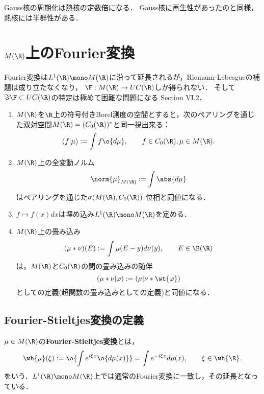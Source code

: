 \documentclass[uplatex,dvipdfmx]{jsreport}
\begin{document}
\begin{tcolorbox}[colframe=ForestGreen, colback=ForestGreen!10!white,breakable,colbacktitle=ForestGreen!40!white,coltitle=black,fonttitle=\bfseries\sffamily,
title=]
    Gauss核の周期化は熱核の定数倍になる．
    Gauss核に再生性があったのと同様，熱核には半群性がある．
\end{tcolorbox}

\section{$M(\R)$上のFourier変換}

\begin{tcolorbox}[colframe=ForestGreen, colback=ForestGreen!10!white,breakable,colbacktitle=ForestGreen!40!white,coltitle=black,fonttitle=\bfseries\sffamily,
title=]
    Fourier変換は$L^1(\R)\mono M(\R)$に沿って延長されるが，Riemann-Lebesgueの補題は成り立たなくなり，
    $\F:M(\R)\to UC(\R)$しか得られない．
    そして$\Im\F\subset UC(\R)$の特定は極めて困難な問題になる\cite{Katznelson-Fourier} Section VI.2．
\end{tcolorbox}

\begin{remarks}\mbox{}
    \begin{enumerate}
        \item $M(\R)$を$\R$上の符号付きBorel測度の空間とすると，次のペアリングを通じた双対空間$M(\R)=(C_0(\R))^*$と同一視出来る：
        \[(f|\mu):=\int f\o{d\mu},\qquad f\in C_0(\R),\mu\in M(\R).\]
        \item $M(\R)$上の全変動ノルム
        \[\norm{\mu}_{M(\R)}:=\int\abs{d\mu}\]
        はペアリングを通じた$\sigma(M(\R),C_0(\R))$-位相と同値になる．
        \item $f\mapsto f(x)dx$は埋め込み$L^1(\R)\mono M(\R)$を定める．
        \item $M(\R)$上の畳み込み
        \[(\mu*\nu)(E):=\int\mu(E-y)d\nu(y),\qquad E\in\B(\R)\]
        は，$M(\R)$と$C_0(\R)$の間の畳み込みの随伴
        \[(\mu*\nu|\varphi):=(\mu|\nu*\wt{\varphi})\]
        としての定義(超関数の畳み込みとしての定義)と同値になる．
    \end{enumerate}
\end{remarks}

\subsection{Fourier-Stieltjes変換の定義}

\begin{definition}
    $\mu\in M(\R)$の\textbf{Fourier-Stieltjes変換}とは，
    \[\wh{\mu}(\xi):=\o{\int e^{i\xi x}\o{d\mu(x)}}=\int e^{-i\xi x}d\mu(x),\qquad\xi\in\wh{\R}.\]
    をいう．$L^1(\R)\mono M(\R)$上では通常のFourier変換に一致し，その延長となっている．
\end{definition}
\end{document}
